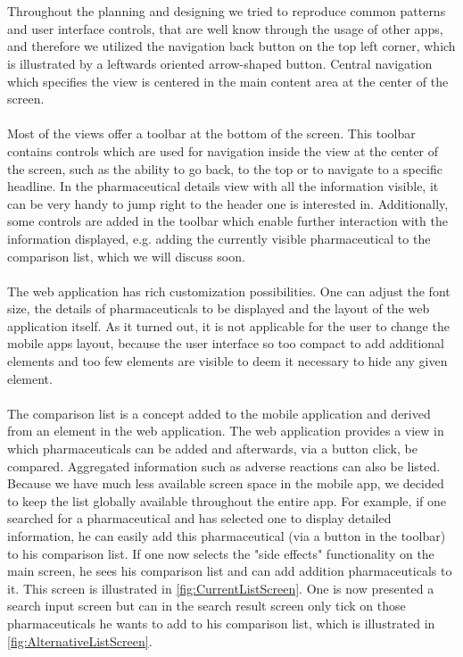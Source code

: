 \\
\\
Throughout the planning and designing we tried to reproduce common patterns and user interface controls, that are well know through the usage of other apps, and therefore we utilized the navigation back button on the top left corner, which is illustrated by a leftwards oriented arrow-shaped button. Central navigation which specifies the view is centered in the main content area at the center of the screen.
\\
\\
Most of the views offer a toolbar at the bottom of the screen. This toolbar contains controls which are used for navigation inside the view at the center of the screen, such as the ability to go back, to the top or to navigate to a specific headline. In the pharmaceutical details view with all the information visible, it can be very handy to jump right to the header one is interested in. Additionally, some controls are added in the toolbar which enable further interaction with the information displayed, e.g. adding the currently visible pharmaceutical to the comparison list, which we will discuss soon.
\\
\\
The web application has rich customization possibilities. One can adjust the font size, the details of pharmaceuticals to be displayed and the layout of the web application itself. As it turned out, it is not applicable for the user to change the mobile apps layout, because the user interface so too compact to add additional elements and too few elements are visible to deem it necessary to hide any given element.
\\
\\
The comparison list is a concept added to the mobile application and derived from an element in the web application. The web application provides a view in which pharmaceuticals can be added and afterwards, via a button click, be compared. Aggregated information such as adverse reactions can also be listed. Because we have much less available screen space in the mobile app, we decided to keep the list globally available throughout the entire app. For example, if one searched for a pharmaceutical and has selected one to display detailed information, he can easily add this pharmaceutical (via a button in the toolbar) to his comparison list. If one now selects the "side effects" functionality on the main screen, he sees his comparison list and can add addition pharmaceuticals to it. This screen is illustrated in \ref{fig:CurrentListScreen}. One is now presented a search input screen but can in the search result screen only tick on those pharmaceuticals he wants to add to his comparison list, which is illustrated in \ref{fig:AlternativeListScreen}.
